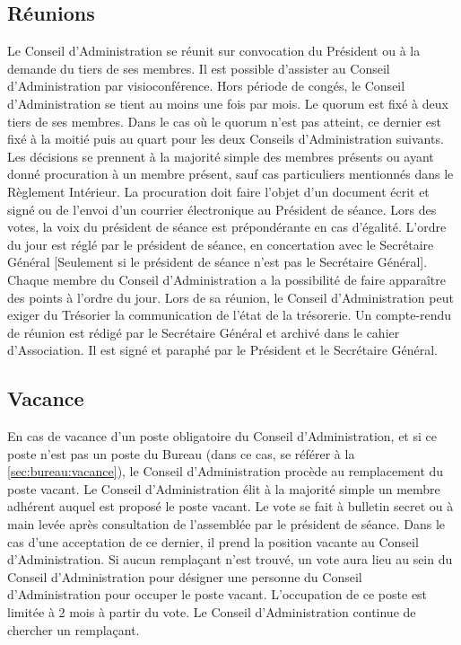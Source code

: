 \documentclass[12pt]{article}
\begin{document}
\subsection{Réunions}
\label{sec:conseil:reunions}

Le Conseil d’Administration se réunit sur convocation du Président ou à la demande du tiers de ses membres.
Il est possible d’assister au Conseil d’Administration par visioconférence.
Hors période de congés, le Conseil d’Administration se tient au moins une fois par mois.
Le quorum est fixé à deux tiers de ses membres. Dans le cas où le quorum n’est pas atteint, ce dernier est fixé
à la moitié puis au quart pour les deux Conseils d’Administration suivants.
Les décisions se prennent à la majorité simple des membres présents ou ayant donné procuration à un
membre présent, sauf cas particuliers mentionnés dans le Règlement Intérieur. La procuration doit faire
l’objet d’un document écrit et signé ou de l’envoi d’un courrier électronique au Président de séance.
Lors des votes, la voix du président de séance est prépondérante en cas d’égalité. L’ordre du jour est réglé par
le président de séance, en concertation avec le Secrétaire Général [Seulement si le président de séance n’est
pas le Secrétaire Général].
Chaque membre du Conseil d’Administration a la possibilité de faire apparaître des points à l’ordre du jour.
Lors de sa réunion, le Conseil d’Administration peut exiger du Trésorier la communication de l’état de la
trésorerie.
Un compte-rendu de réunion est rédigé par le Secrétaire Général et archivé dans le cahier d’Association. Il est
signé et paraphé par le Président et le Secrétaire Général.

\subsection{Vacance}
\label{sec:conseil:vacance}

En cas de vacance d’un poste obligatoire du Conseil d’Administration, et si ce poste n’est pas un poste du
Bureau (dans ce cas, se référer à la \autoref{sec:bureau:vacance}), le Conseil d’Administration procède au remplacement
du poste vacant.
Le Conseil d’Administration élit à la majorité simple un membre adhérent auquel est proposé le poste
vacant. Le vote se fait à bulletin secret ou à main levée après consultation de l’assemblée par le président de
séance. Dans le cas d’une acceptation de ce dernier, il prend la position vacante au Conseil
d’Administration.
Si aucun remplaçant n’est trouvé, un vote aura lieu au sein du Conseil d’Administration pour désigner une
personne du Conseil d’Administration pour occuper le poste vacant. L’occupation de ce poste est limitée à 2
mois à partir du vote.
Le Conseil d’Administration continue de chercher un remplaçant.
\end{document}
